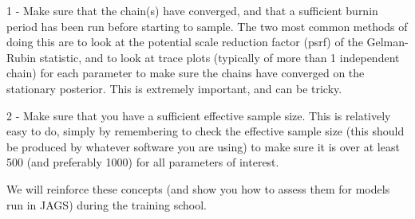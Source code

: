 \documentclass[
  12pt,
]{article}
\begin{document}
1 - Make sure that the chain(s) have converged, and that a sufficient
burnin period has been run before starting to sample. The two most
common methods of doing this are to look at the potential scale
reduction factor (psrf) of the Gelman-Rubin statistic, and to look at
trace plots (typically of more than 1 independent chain) for each
parameter to make sure the chains have converged on the stationary
posterior. This is extremely important, and can be tricky.

2 - Make sure that you have a sufficient effective sample size. This is
relatively easy to do, simply by remembering to check the effective
sample size (this should be produced by whatever software you are using)
to make sure it is over at least 500 (and preferably 1000) for all
parameters of interest.

We will reinforce these concepts (and show you how to assess them for
models run in JAGS) during the training school.
\end{document}
